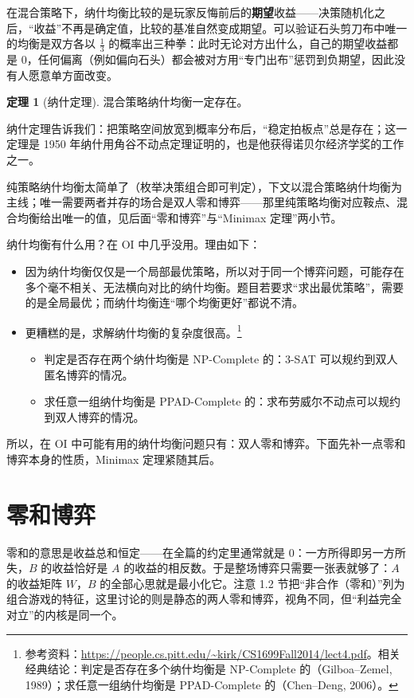 \documentclass[UTF8,a4paper,11pt,oneside,openany,fontset=fandol]{ctexbook}
\theoremstyle{definition}
\newtheorem{theorem}[definition]{定理}
\begin{document}
在混合策略下，纳什均衡比较的是玩家反悔前后的\textbf{期望}收益——决策随机化之后，“收益”不再是确定值，比较的基准自然变成期望。可以验证石头剪刀布中唯一的均衡是双方各以 $\tfrac13$ 的概率出三种拳：此时无论对方出什么，自己的期望收益都是 $0$，任何偏离（例如偏向石头）都会被对方用“专门出布”惩罚到负期望，因此没有人愿意单方面改变。

\begin{theorem}[纳什定理]\label{thm:nash}
混合策略纳什均衡一定存在。
\end{theorem}

纳什定理告诉我们：把策略空间放宽到概率分布后，“稳定拍板点”总是存在；这一定理是 1950 年纳什用角谷不动点定理证明的，也是他获得诺贝尔经济学奖的工作之一。

纯策略纳什均衡太简单了（枚举决策组合即可判定），下文以混合策略纳什均衡为主线；唯一需要两者并存的场合是双人零和博弈——那里纯策略均衡对应鞍点、混合均衡给出唯一的值，见后面“零和博弈”与“Minimax 定理”两小节。

纳什均衡有什么用？在 OI 中几乎没用。理由如下：
\begin{itemize}
\item 因为纳什均衡仅仅是一个局部最优策略，所以对于同一个博弈问题，可能存在多个毫不相关、无法横向对比的纳什均衡。题目若要求“求出最优策略”，需要的是全局最优；而纳什均衡连“哪个均衡更好”都说不清。
\item 更糟糕的是，求解纳什均衡的复杂度很高。\footnote{参考资料：\url{https://people.cs.pitt.edu/~kirk/CS1699Fall2014/lect4.pdf}。相关经典结论：判定是否存在多个纳什均衡是 NP-Complete 的（Gilboa--Zemel, 1989）；求任意一组纳什均衡是 PPAD-Complete 的（Chen--Deng, 2006）。}
\begin{itemize}
\item 判定是否存在两个纳什均衡是 NP-Complete 的：3-SAT 可以规约到双人匿名博弈的情况。
\item 求任意一组纳什均衡是 PPAD-Complete 的：求布劳威尔不动点可以规约到双人博弈的情况。
\end{itemize}
\end{itemize}
所以，在 OI 中可能有用的纳什均衡问题只有：双人零和博弈。下面先补一点零和博弈本身的性质，Minimax 定理紧随其后。

\section{零和博弈}
零和的意思是收益总和恒定——在全篇的约定里通常就是 $0$：一方所得即另一方所失，$B$ 的收益恰好是 $A$ 的收益的相反数。于是整场博弈只需要一张表就够了：$A$ 的收益矩阵 $W$，$B$ 的全部心思就是最小化它。注意 1.2 节把“非合作（零和）”列为组合游戏的特征，这里讨论的则是静态的两人零和博弈，视角不同，但“利益完全对立”的内核是同一个。
\end{document}
